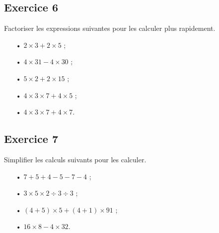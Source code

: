 \documentclass[12 pt]{extarticle}
\theoremstyle{plain}
\begin{document}
\subsection*{Exercice 6}

Factoriser les expressions suivantes pour les calculer plus rapidement. \begin{itemize}
\item[•] $ 2 \times 3 + 2 \times 5$ ;
\item[•] $ 4 \times 31 - 4 \times 30 $ ;
\item[•] $ 5 \times 2 + 2 \times 15$ ;
\item[•] $ 4 \times 3 \times 7 + 4 \times 5$ ;
\item[•] $ 4 \times 3 \times 7 + 4 \times 7$.
\end{itemize}

\subsection*{Exercice 7}

Simplifier les calculs suivants pour les calculer. \begin{itemize}
\item[•] $ 7 + 5 + 4 - 5 - 7 - 4$ ; 
\item[•] $ 3 \times 5 \times 2 \div 3 \div 3$ ;
\item[•] $ (4 + 5) \times 5 + (4+1) \times 91$ ;
\item[•] $ 16 \times 8 - 4 \times 32$.
\end{itemize}


 	
\end{document}
